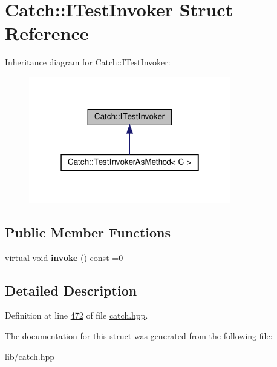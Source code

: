 \hypertarget{structCatch_1_1ITestInvoker}{}\section{Catch\+::I\+Test\+Invoker Struct Reference}
\label{structCatch_1_1ITestInvoker}


Inheritance diagram for Catch\+::I\+Test\+Invoker\+:
\nopagebreak
\begin{figure}[H]
\begin{center}
\leavevmode
\includegraphics[width=250pt]{structCatch_1_1ITestInvoker__inherit__graph}
\end{center}
\end{figure}
\subsection*{Public Member Functions}
\begin{DoxyCompactItemize}
\item 
\mbox{\label{structCatch_1_1ITestInvoker_a6fcd5c5b67d6d5ade6491ff33411ca7f}} 
virtual void {\bfseries invoke} () const =0
\end{DoxyCompactItemize}


\subsection{Detailed Description}


Definition at line \mbox{\hyperlink{catch_8hpp_source_l00472}{472}} of file \mbox{\hyperlink{catch_8hpp_source}{catch.\+hpp}}.



The documentation for this struct was generated from the following file\+:\begin{DoxyCompactItemize}
\item 
lib/catch.\+hpp\end{DoxyCompactItemize}
